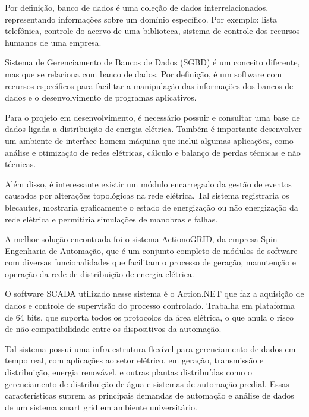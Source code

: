 Por definição, banco de dados é uma coleção de dados interrelacionados, representando informações sobre um domínio específico. Por exemplo: lista telefônica, controle do acervo de uma biblioteca, sistema de controle dos recursos humanos de uma empresa. 

Sistema de Gerenciamento de Bancos de Dados (SGBD) é um conceito diferente, mas que se relaciona com banco de dados. Por definição, é um software com recursos específicos para facilitar a manipulação das informações dos bancos de dados e o desenvolvimento de programas aplicativos.

Para o projeto em desenvolvimento, é necessário possuir e consultar uma base de dados ligada a distribuição de energia elétrica. Também é importante desenvolver um ambiente de interface homem-máquina que inclui algumas aplicações, como análise e otimização de redes elétricas, cálculo e balanço de perdas técnicas e não técnicas.

Além disso, é interessante existir um módulo encarregado da gestão de eventos causados por alterações topológicas na rede elétrica. Tal sistema registraria os blecautes, mostraria graficamente o estado de energização ou não energização da rede elétrica e permitiria simulações de manobras e falhas. 

A melhor solução encontrada foi o sistema ActionoGRID, da empresa Spin Engenharia de Automação, que é um conjunto completo de módulos de software com diversas funcionalidades que facilitam o processo de geração, manutenção e operação da rede de distribuição de energia elétrica.

O software SCADA utilizado nesse sistema é o Action.NET que faz a aquisição de dados e controle de supervisão do processo controlado. Trabalha em plataforma de 64 bits, que suporta todos os protocolos da área elétrica, o que anula o risco de não compatibilidade entre os dispositivos da automação.

Tal sistema possui uma infra-estrutura flexível para gerenciamento de dados em tempo real, com aplicações ao setor elétrico, em geração, transmissão e distribuição, energia renovável, e outras plantas distribuídas como o gerenciamento de distribuição de água e sistemas de automação predial. Essas características suprem as principais demandas de automação e análise de dados de um sistema smart grid em ambiente universitário.

